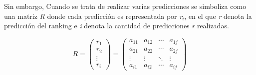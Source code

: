 Sin embargo, Cuando se trata de realizar varias predicciones se simboliza como una matriz \textit{R} donde cada predicción es representada  por \textit{r$_{i}$}, en el que \textit{r} denota la predicción del ranking  e \textit{i} denota la cantidad de predicciones \textit{r} realizadas.
\begin{center}
    \[  \textit{R} = 
        \begin{pmatrix}
            \textit{r$_{1}$}  \\ 
            \textit{r$_{2}$}  \\ 
            \vdots  \\ 
            \textit{r$_{i}$}
        \end{pmatrix} 
        =
        \begin{pmatrix}
            a_{11}  &  a_{12}  &  \cdots   & a_{1j} \\ 
            a_{21}  &  a_{22}  &  \cdots   & a_{2j}\\ 
            \vdots  &  \vdots  &  \ddots & \vdots  \\ 
            a_{i1}  &  a_{i2}  &  \cdots   & a_{ij}
        \end{pmatrix}
    \]
\end{center}
\newpage
